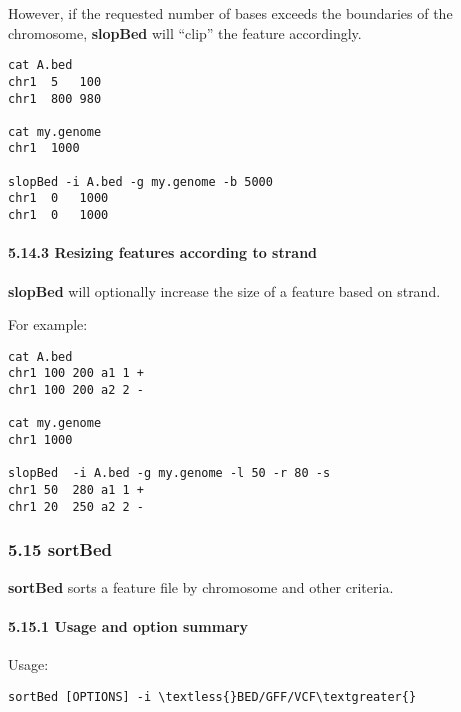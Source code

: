 \documentclass[letterpaper,10pt,english]{sphinxmanual}
\begin{document}
However, if the requested number of bases exceeds the boundaries of the chromosome, \textbf{slopBed} will
``clip'' the feature accordingly.

\begin{Verbatim}[commandchars=\\\{\}]
cat A.bed
chr1  5   100
chr1  800 980

cat my.genome
chr1  1000

slopBed -i A.bed -g my.genome -b 5000
chr1  0   1000
chr1  0   1000
\end{Verbatim}


\paragraph{5.14.3 Resizing features according to strand}
\label{content/slopBed:resizing-features-according-to-strand}
\textbf{slopBed} will optionally increase the size of a feature based on strand.

For example:

\begin{Verbatim}[commandchars=\\\{\}]
cat A.bed
chr1 100 200 a1 1 +
chr1 100 200 a2 2 -

cat my.genome
chr1 1000

slopBed  -i A.bed -g my.genome -l 50 -r 80 -s
chr1 50  280 a1 1 +
chr1 20  250 a2 2 -
\end{Verbatim}


\subsubsection{5.15 sortBed}
\label{content/sortBed::doc}\label{content/sortBed:sortbed}
\textbf{sortBed} sorts a feature file by chromosome and other criteria.


\paragraph{5.15.1 Usage and option summary}
\label{content/sortBed:usage-and-option-summary}
Usage:

\begin{Verbatim}[commandchars=\\\{\}]
sortBed [OPTIONS] -i \textless{}BED/GFF/VCF\textgreater{}
\end{Verbatim}
\end{document}
